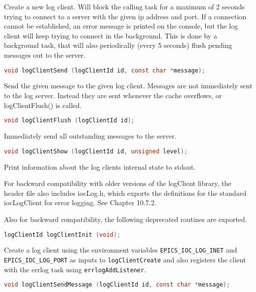 Create a new log client.
Will block the calling task for a maximum of 2 seconds trying to connect to a server with the given ip address and port.
If a connection cannot be established, an error message is printed on the console, but the log client will keep trying to connect in the background.
This is done by a background task, that will also periodically (every 5 seconds) flush pending messages out to the server.

\begin{lstlisting}[language=C]
void logClientSend (logClientId id, const char *message);
\end{lstlisting}

Send the given message to the given log client.
Messages are not immediately sent to the log server.
Instead they are sent whenever the cache overflows, or logClientFlush() is called.

\begin{lstlisting}[language=C]
void logClientFlush (logClientId id);
\end{lstlisting}

Immediately send all outstanding messages to the server.

\begin{lstlisting}[language=C]
void logClientShow (logClientId id, unsigned level);
\end{lstlisting}

Print information about the log clients internal state to stdout.

For backward compatibility with older versions of the logClient library, the header file also includes iocLog.h, which exports the definitions for the standard iocLogClient for error logging.
See Chapter 10.7.2.

Also for backward compatibility, the following deprecated routines are exported.

\begin{lstlisting}[language=C]
logClientId logClientInit (void);
\end{lstlisting}

Create a log client using the environment variables \verb|EPICS_IOC_LOG_INET| and \verb|EPICS_IOC_LOG_PORT| as inputs to \verb|logClientCreate| and also registers the client with the errlog task using \verb|errlogAddListener|.

\begin{lstlisting}[language=C]
void logClientSendMessage (logClientId id, const char *message);
\end{lstlisting}

